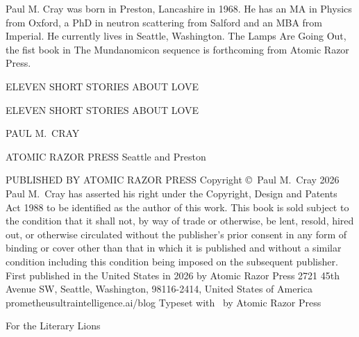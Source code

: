 \startcentered
\frontmattergap
Paul M. Cray was born in Preston, Lancashire in 1968.
He has an MA in Physics from Oxford,
a PhD in neutron scattering from Salford and an MBA from Imperial.
He currently lives in Seattle, Washington.
{\twelvesl The Lamps Are Going Out}, the fist book in {\twelvesl The Mundanomicon\/} sequence is forthcoming from Atomic Razor Press.
\stopcentered

\blankpage

\startcentered
\frontmattergap
{\twelvess ELEVEN SHORT STORIES ABOUT LOVE}
\stopcentered

\blankpage

\startcentered
\frontmattergap
{\seventeenss ELEVEN SHORT STORIES ABOUT LOVE\par}
\titlegap
{\seventeenss PAUL M.~CRAY\par}
\publishergap
{\twelvebf ATOMIC RAZOR PRESS}
{\twelvebf Seattle and Preston}
\stopcentered

\startcentered
\twelverm
PUBLISHED BY ATOMIC RAZOR PRESS
\copyrightgap
Copyright \copyright\ Paul M.~Cray 2026
\copyrightgap
Paul M.~Cray has asserted his right under the Copyright, Design
and Patents Act 1988 to be identified as the author of this work.
\copyrightgap
{\twelveit This book is sold subject to the condition that it shall not, by way of}
{\twelveit trade or otherwise, be lent, resold, hired out, or otherwise circulated}
{\twelveit without the publisher's prior consent in any form of binding or cover}
{\twelveit other than that in which it is published and without a similar condition}
{\twelveit including this condition being imposed on the subsequent publisher.}
\copyrightgap
First published in the United States in 2026 by
Atomic Razor Press
2721 45th Avenue SW, Seattle, Washington, 98116-2414,
United States of America
\copyrightgap
prometheusultraintelligence.ai/blog
\copyrightgap
Typeset with \OpTeX\ by Atomic Razor Press
\stopcentered

\startcentered
\frontmattergap
{\twelveit For the Literary Lions}
\stopcentered

\blankpage

